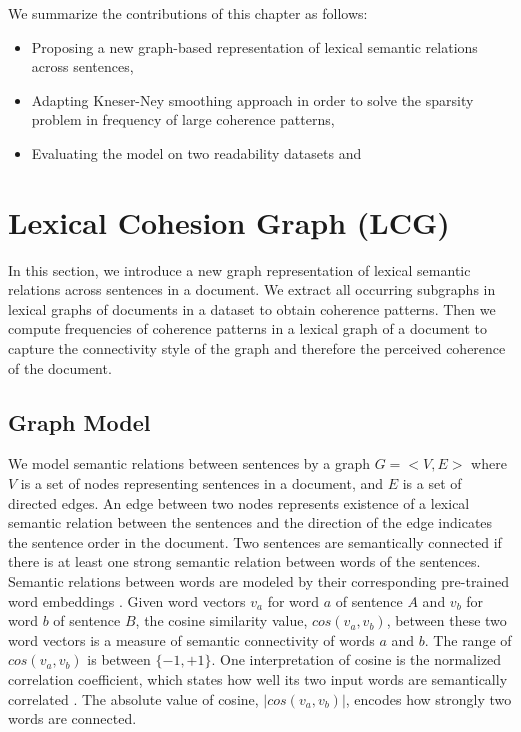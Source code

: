 We summarize the contributions of this chapter as follows:

\begin{itemize}

  \item Proposing a new \mbox{graph-based} representation of lexical semantic relations across sentences,

  \item Adapting \mbox{Kneser-Ney} smoothing approach in order to solve the sparsity problem in frequency of large coherence patterns,  

  \item Evaluating the model on two readability datasets  and 

\end{itemize}


\section{Lexical Cohesion Graph (LCG)}
\label{sec:lexical_coherence_graph}
In this section, we introduce a new graph representation of lexical semantic relations  across sentences in a document. 
We extract all occurring subgraphs in lexical graphs of documents in a dataset to obtain coherence patterns.  
Then we compute frequencies of coherence patterns in a lexical graph of a document to capture the connectivity style of the graph and therefore the perceived coherence of the document. 

\subsection{Graph Model} 
We model semantic relations between sentences by a graph
$G = < V, E > $ where $V$ is a set of nodes representing sentences in a document, and
$E$ is a set of directed edges. 
An edge between two nodes represents existence of a lexical semantic relation between the sentences and the direction of the edge indicates the sentence order in the document.   
Two sentences are semantically connected if there is at least one strong semantic relation between words of the sentences. 
Semantic relations between words are modeled by their corresponding pre-trained word embeddings \cite{pennington14}. 
Given word vectors $v_a$ for word $a$ of sentence $A$ and $v_b$ for word $b$ of sentence $B$, the cosine similarity value, $cos(v_a,v_b)$, between these two word vectors is a measure of semantic connectivity of words $a$ and $b$. 
The range of $cos(v_a,v_b)$ is between $\lbrace -1, +1 \rbrace$. 
One interpretation of cosine is the normalized correlation coefficient, which states how well its two input words are semantically correlated \cite{manning99}. 
The absolute value of cosine, $|cos(v_a,v_b)|$, encodes how strongly two words are
connected.

